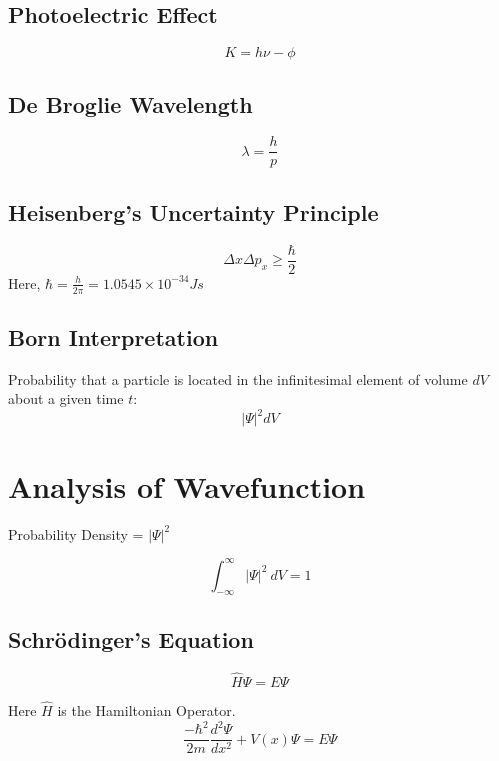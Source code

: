 \documentclass[12pt]{extarticle}
\begin{document}
\subsection{Photoelectric Effect}
\begin{equation}
	K = h\nu - \phi 
\end{equation}

\subsection{De Broglie Wavelength}
\begin{equation}
	\lambda = \frac{h}{p} 
\end{equation}

\subsection{Heisenberg's Uncertainty Principle}
\begin{equation}
	\Delta x \Delta p_x \geq \frac{\hbar}{2} 
\end{equation}
Here, $\hbar = \frac{h}{2\pi} = 1.0545 \times 10^{-34} Js$

\subsection{Born Interpretation}
Probability that a particle is located in the infinitesimal element of volume $dV$ about a given time $t$:
\begin{equation}
	\left| \Psi \right|^2 dV
\end{equation}

\section{Analysis of Wavefunction}
Probability Density = $ \left| \Psi \right| ^2$

\begin{equation} \label{eq:norm}
	\int_{{-\infty}}^{{\infty}} { \left| \Psi \right|^2 } \: d{V} = 1
\end{equation}

\subsection{Schr\"odinger's Equation}
\begin{equation}
	\hat{H} \Psi = E\Psi
\end{equation}

Here $\hat{H}$ is the Hamiltonian Operator.
\begin{equation}
	\frac{-\hbar^2}{2m} \frac{d^2 \Psi}{dx^2} + V(x)\Psi = E\Psi
\end{equation}
\end{document}
